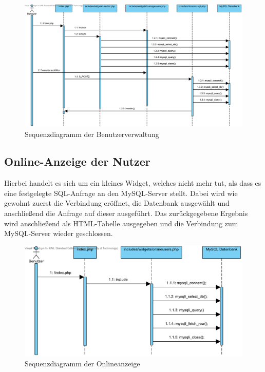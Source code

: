 \documentclass[fontsize = 12pt, paper = a4]{scrreprt}
\begin{document}
\begin{figure}[h]
\centering
\includegraphics[scale = 0.5]{usermgmt}
\caption[Sequenzdiagramm der Benutzerverwaltung]{Sequenzdiagramm der Benutzerverwaltung}
\label{usermgmt}
\end{figure}

\newpage
\subsection{Online-Anzeige der Nutzer}
Hierbei handelt es sich um ein kleines Widget, welches nicht mehr tut, als dass es eine festgelegte SQL-Anfrage an den MySQL-Server stellt. Dabei wird wie gewohnt zuerst die Verbindung eröffnet, die Datenbank ausgewählt und anschließend die Anfrage auf dieser ausgeführt. Das zurückgegebene Ergebnis wird anschließend als HTML-Tabelle ausgegeben und die Verbindung zum MySQL-Server wieder geschlossen.

\begin{figure}[h]
\centering
\includegraphics[scale = 0.8]{online}
\caption[Sequenzdiagramm der Onlineanzeige]{Sequenzdiagramm der Onlineanzeige}
\label{online}
\end{figure}
\end{document}
